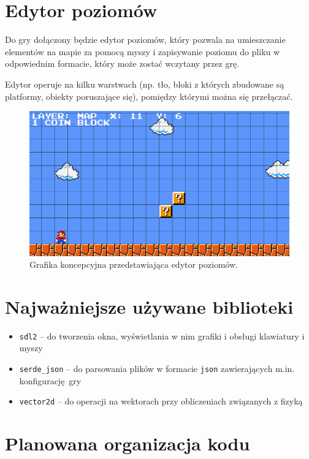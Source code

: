 \documentclass[12pt, a4paper, oneside]{article}
\begin{document}
\section*{Edytor poziomów}

Do gry dołączony będzie edytor poziomów, który pozwala na umieszczanie 
elementów na mapie za pomocą myszy i zapisywanie poziomu do pliku w odpowiednim 
formacie, który może zostać wczytany przez grę.

Edytor operuje na kilku warstwach (np. tło, bloki z których zbudowane są 
platformy, obiekty poruszające się), pomiędzy którymi można się przełączać.

\begin{figure}
    \includegraphics[scale=0.3]{img/editor.png}
    \caption{Grafika koncepcyjna przedstawiająca edytor poziomów.}
\end{figure}

\section*{Najważniejsze używane biblioteki}

\begin{itemize} 
    \item{\texttt{sdl2} -- do tworzenia okna, wyświetlania w nim grafiki i 
    obsługi klawiatury i myszy}
    \item{\texttt{serde\_json} -- do parsowania plików w formacie \texttt{json} 
    zawierających m.in. konfigurację gry}
    \item{\texttt{vector2d} -- do operacji na wektorach przy obliczeniach 
    związanych z fizyką}
\end{itemize}

\section*{Planowana organizacja kodu}
\end{document}
